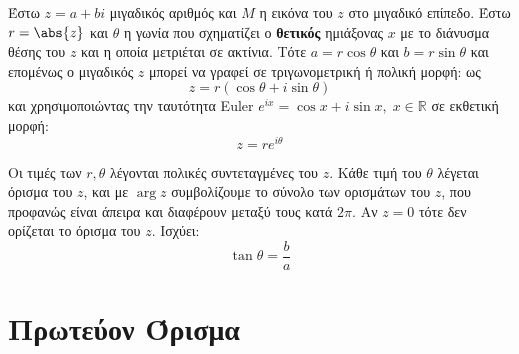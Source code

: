 Έστω $z=a+bi$ μιγαδικός αριθμός και $M$ η εικόνα του $z$ στο μιγαδικό επίπεδο. 
Έστω $r=\abs{z}$ και $\theta$ η γωνία που σχηματίζει ο \textbf{θετικός} ημιάξονας $x$ 
με το διάνυσμα θέσης του $z$ και η οποία μετριέται σε ακτίνια. 
Τότε $a=r\cos \theta$ και $b=r\sin \theta$ και επομένως ο μιγαδικός $z$ μπορεί να γραφεί 
σε \textcolor{Col1}{τριγωνομετρική} ή \textcolor{Col1}{πολική} μορφή: ως
\[
  \boxed{z=r(\cos\theta+i\sin\theta)}
\]
και χρησιμοποιώντας την ταυτότητα Euler $e^{ix}=\cos x+i\sin x, \; x\in\mathbb{R}$ σε
\textcolor{Col1}{εκθετική} μορφή:
\[
  z= re^{i\theta}
\]

Οι τιμές των $r, \theta$ λέγονται \textcolor{Col1}{πολικές συντεταγμένες} του $z$. Κάθε
τιμή του $\theta$ λέγεται \textcolor{Col1}{όρισμα} του $z$, και με $\arg z$ συμβολίζουμε
το σύνολο των ορισμάτων του $z$, που προφανώς είναι άπειρα και διαφέρουν μεταξύ τους κατά
$2\pi$. Αν $z=0$ τότε δεν ορίζεται το όρισμα του $z$. Ισχύει:
\[
  \tan\theta=\frac{b}{a}
\]


\section*{Πρωτεύον Όρισμα}


